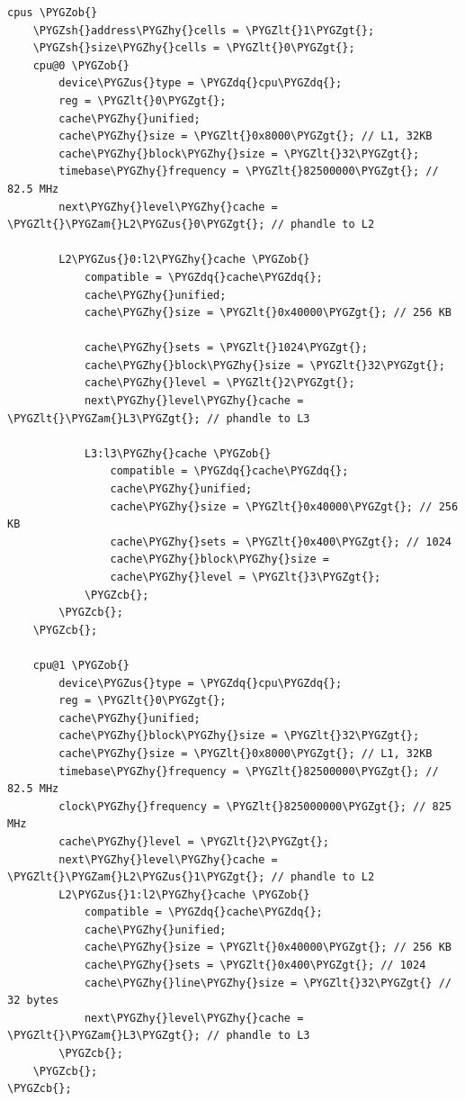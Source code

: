 \documentclass[a4paper,10pt,oneside]{sphinxmanual}
\def\PYGZus{\char`\_}
\def\PYGZob{\char`\{}
\def\PYGZcb{\char`\}}
\def\PYGZam{\char`\&}
\def\PYGZlt{\char`\<}
\def\PYGZgt{\char`\>}
\def\PYGZsh{\char`\#}
\def\PYGZhy{\char`\-}
\def\PYGZdq{\char`\"}
\begin{document}
\begin{Verbatim}[commandchars=\\\{\}]
cpus \PYGZob{}
    \PYGZsh{}address\PYGZhy{}cells = \PYGZlt{}1\PYGZgt{};
    \PYGZsh{}size\PYGZhy{}cells = \PYGZlt{}0\PYGZgt{};
    cpu@0 \PYGZob{}
        device\PYGZus{}type = \PYGZdq{}cpu\PYGZdq{};
        reg = \PYGZlt{}0\PYGZgt{};
        cache\PYGZhy{}unified;
        cache\PYGZhy{}size = \PYGZlt{}0x8000\PYGZgt{}; // L1, 32KB
        cache\PYGZhy{}block\PYGZhy{}size = \PYGZlt{}32\PYGZgt{};
        timebase\PYGZhy{}frequency = \PYGZlt{}82500000\PYGZgt{}; // 82.5 MHz
        next\PYGZhy{}level\PYGZhy{}cache = \PYGZlt{}\PYGZam{}L2\PYGZus{}0\PYGZgt{}; // phandle to L2

        L2\PYGZus{}0:l2\PYGZhy{}cache \PYGZob{}
            compatible = \PYGZdq{}cache\PYGZdq{};
            cache\PYGZhy{}unified;
            cache\PYGZhy{}size = \PYGZlt{}0x40000\PYGZgt{}; // 256 KB

            cache\PYGZhy{}sets = \PYGZlt{}1024\PYGZgt{};
            cache\PYGZhy{}block\PYGZhy{}size = \PYGZlt{}32\PYGZgt{};
            cache\PYGZhy{}level = \PYGZlt{}2\PYGZgt{};
            next\PYGZhy{}level\PYGZhy{}cache = \PYGZlt{}\PYGZam{}L3\PYGZgt{}; // phandle to L3

            L3:l3\PYGZhy{}cache \PYGZob{}
                compatible = \PYGZdq{}cache\PYGZdq{};
                cache\PYGZhy{}unified;
                cache\PYGZhy{}size = \PYGZlt{}0x40000\PYGZgt{}; // 256 KB
                cache\PYGZhy{}sets = \PYGZlt{}0x400\PYGZgt{}; // 1024
                cache\PYGZhy{}block\PYGZhy{}size =
                cache\PYGZhy{}level = \PYGZlt{}3\PYGZgt{};
            \PYGZcb{};
        \PYGZcb{};
    \PYGZcb{};

    cpu@1 \PYGZob{}
        device\PYGZus{}type = \PYGZdq{}cpu\PYGZdq{};
        reg = \PYGZlt{}0\PYGZgt{};
        cache\PYGZhy{}unified;
        cache\PYGZhy{}block\PYGZhy{}size = \PYGZlt{}32\PYGZgt{};
        cache\PYGZhy{}size = \PYGZlt{}0x8000\PYGZgt{}; // L1, 32KB
        timebase\PYGZhy{}frequency = \PYGZlt{}82500000\PYGZgt{}; // 82.5 MHz
        clock\PYGZhy{}frequency = \PYGZlt{}825000000\PYGZgt{}; // 825 MHz
        cache\PYGZhy{}level = \PYGZlt{}2\PYGZgt{};
        next\PYGZhy{}level\PYGZhy{}cache = \PYGZlt{}\PYGZam{}L2\PYGZus{}1\PYGZgt{}; // phandle to L2
        L2\PYGZus{}1:l2\PYGZhy{}cache \PYGZob{}
            compatible = \PYGZdq{}cache\PYGZdq{};
            cache\PYGZhy{}unified;
            cache\PYGZhy{}size = \PYGZlt{}0x40000\PYGZgt{}; // 256 KB
            cache\PYGZhy{}sets = \PYGZlt{}0x400\PYGZgt{}; // 1024
            cache\PYGZhy{}line\PYGZhy{}size = \PYGZlt{}32\PYGZgt{} // 32 bytes
            next\PYGZhy{}level\PYGZhy{}cache = \PYGZlt{}\PYGZam{}L3\PYGZgt{}; // phandle to L3
        \PYGZcb{};
    \PYGZcb{};
\PYGZcb{};
\end{Verbatim}
\end{document}
